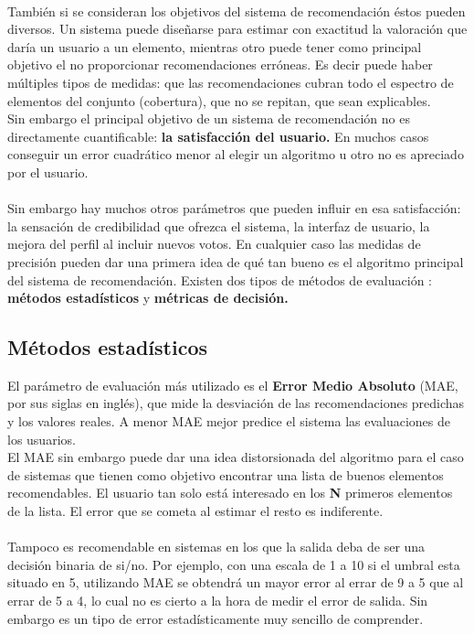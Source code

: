 \documentclass[12pt,letterpaper,oneside] {memoir}
\begin{document}
\paragraph{}
También si se consideran los objetivos del sistema de recomendación éstos pueden diversos. Un sistema puede diseñarse para estimar con exactitud la valoración que daría un usuario a un elemento, mientras otro puede tener como principal objetivo el no proporcionar recomendaciones erróneas. Es decir puede haber múltiples tipos de medidas: que las recomendaciones cubran todo el espectro de elementos del conjunto (cobertura), que no se repitan, que sean explicables. \\
Sin embargo el principal objetivo de un sistema de recomendación no es directamente cuantificable: \textbf{la satisfacción del usuario.} En muchos casos conseguir un error cuadrático menor al elegir un algoritmo u otro no es apreciado por el usuario.
\paragraph{}
Sin embargo hay muchos otros parámetros que pueden influir en esa satisfacción: la sensación de credibilidad que ofrezca el sistema, la interfaz de usuario, la mejora del perfil al incluir nuevos votos.  En cualquier caso las medidas de precisión pueden dar una primera idea de qué tan bueno es el algoritmo principal del sistema de recomendación. Existen dos tipos de métodos de evaluación \citep{GalanNieto1994}: \textbf{métodos estadísticos} y \textbf{métricas de decisión.}

\subsection{Métodos estadísticos}
El parámetro de evaluación más utilizado es el \textbf{Error Medio Absoluto} (MAE, por sus siglas en inglés), que mide la desviación de las recomendaciones predichas y los valores reales. A menor MAE mejor predice el sistema las evaluaciones de los usuarios. \\
El MAE sin embargo puede dar una idea distorsionada del algoritmo para el caso de sistemas que tienen como objetivo encontrar una lista de buenos elementos recomendables. El usuario tan solo está interesado en los \textbf{N} primeros elementos de la lista. El error que se cometa al estimar el resto es indiferente. 
\paragraph*{}
Tampoco es recomendable en sistemas en los que la salida deba de ser una decisión binaria de si/no. Por ejemplo, con una escala de 1 a 10 si el umbral esta situado en 5, utilizando MAE se obtendrá un mayor error al errar de 9 a 5 que al errar de 5 a 4, lo cual no es cierto a la hora de medir el error de salida. Sin embargo es un tipo de error estadísticamente muy sencillo de comprender. 
\end{document}
